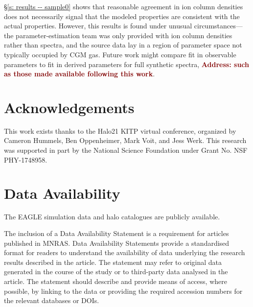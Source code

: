 \documentclass[fleqn,usenatbib]{mnras}
\newcommand{\todo}[1]{\textcolor{Maroon}{\textbf{Address: #1}}}
\begin{document}
\S\ref{s: results -- sample0} shows that reasonable agreement in ion column densities does not necessarily signal that the modeled properties are consistent with the actual properties.
However, this results is found under unusual circumstances---the parameter-estimation team was only provided with ion column densities rather than spectra, and the source data lay in a region of parameter space not typically occupied by CGM gas.
Future work might compare fit in observable parameters to fit in derived parameters for full synthetic spectra,
\todo{such as those made available following this work}.

\section*{Acknowledgements}

This work exists thanks to the Halo21 KITP virtual conference, organized by Cameron Hummels, Ben Oppenheimer, Mark Voit, and Jess Werk.
This research was supported in part by the National Science Foundation under Grant No. NSF PHY-1748958.

\section*{Data Availability}

The EAGLE simulation data \citep{EagleTeam2017} and halo catalogues \citep{McAlpine2016} are publicly available. 

The inclusion of a Data Availability Statement is a requirement for articles published in MNRAS. Data Availability Statements provide a standardised format for readers to understand the availability of data underlying the research results described in the article. The statement may refer to original data generated in the course of the study or to third-party data analysed in the article. The statement should describe and provide means of access, where possible, by linking to the data or providing the required accession numbers for the relevant databases or DOIs.





\end{document}
